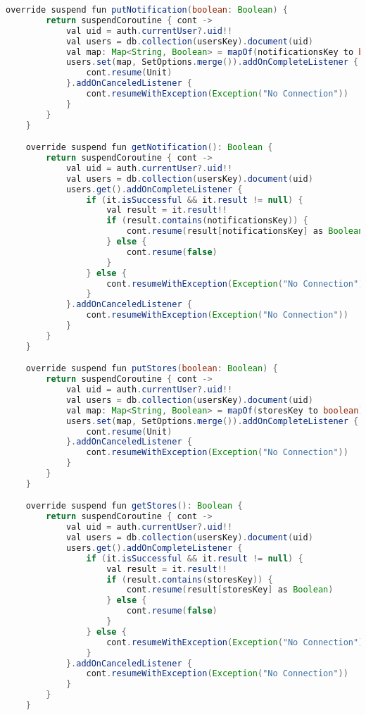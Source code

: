 \begin{lstlisting}[language=Java,label={lst:add:firebase}]
    override suspend fun putNotification(boolean: Boolean) {
        return suspendCoroutine { cont ->
            val uid = auth.currentUser?.uid!!
            val users = db.collection(usersKey).document(uid)
            val map: Map<String, Boolean> = mapOf(notificationsKey to boolean)
            users.set(map, SetOptions.merge()).addOnCompleteListener {
                cont.resume(Unit)
            }.addOnCanceledListener {
                cont.resumeWithException(Exception("No Connection"))
            }
        }
    }

    override suspend fun getNotification(): Boolean {
        return suspendCoroutine { cont ->
            val uid = auth.currentUser?.uid!!
            val users = db.collection(usersKey).document(uid)
            users.get().addOnCompleteListener {
                if (it.isSuccessful && it.result != null) {
                    val result = it.result!!
                    if (result.contains(notificationsKey)) {
                        cont.resume(result[notificationsKey] as Boolean)
                    } else {
                        cont.resume(false)
                    }
                } else {
                    cont.resumeWithException(Exception("No Connection"))
                }
            }.addOnCanceledListener {
                cont.resumeWithException(Exception("No Connection"))
            }
        }
    }

    override suspend fun putStores(boolean: Boolean) {
        return suspendCoroutine { cont ->
            val uid = auth.currentUser?.uid!!
            val users = db.collection(usersKey).document(uid)
            val map: Map<String, Boolean> = mapOf(storesKey to boolean)
            users.set(map, SetOptions.merge()).addOnCompleteListener {
                cont.resume(Unit)
            }.addOnCanceledListener {
                cont.resumeWithException(Exception("No Connection"))
            }
        }
    }

    override suspend fun getStores(): Boolean {
        return suspendCoroutine { cont ->
            val uid = auth.currentUser?.uid!!
            val users = db.collection(usersKey).document(uid)
            users.get().addOnCompleteListener {
                if (it.isSuccessful && it.result != null) {
                    val result = it.result!!
                    if (result.contains(storesKey)) {
                        cont.resume(result[storesKey] as Boolean)
                    } else {
                        cont.resume(false)
                    }
                } else {
                    cont.resumeWithException(Exception("No Connection"))
                }
            }.addOnCanceledListener {
                cont.resumeWithException(Exception("No Connection"))
            }
        }
    }


\end{lstlisting}
